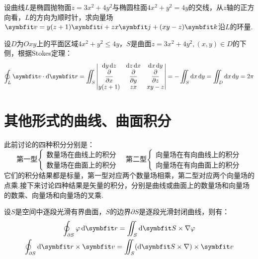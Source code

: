 \begin{question}
    设曲线$L$是椭圆抛物面$z = 3x^2 + 4y^2$与椭圆柱面$4x^2+y^2 = 4y$的交线，从$z$轴的正方向看，$L$的方向为顺时针，求向量场$\vb{v} = y(z+1)\vb{i} + zx\vb{j} + (xy-z)\vb{k}$沿$L$的环量.
\end{question}

\begin{solution}
    设$D$为$Oxy$上的平面区域$4x^2+y^2\leqslant 4y$，$S$是曲面$z = 3x^2+4y^2,(x,y)\in D$的下侧，根据Stokes定理：
    \[\oint_L \vb{v}\cdot\dd{\vb{r}} = \iint_S\begin{vmatrix}
        \dd{y}\dd{z} & \dd{z}\dd{x} & \dd{x}\dd{y} \\
        \displaystyle\pdv{x} & \displaystyle\pdv{y} & \displaystyle\pdv{z} \\
        y(z+1) & zx & xy-z
    \end{vmatrix} = -\iint_S\dd{x}\dd{y} = \iint_D\dd{x}\dd{y} = 2\pi\]
\end{solution}


\section{其他形式的曲线、曲面积分}
此前讨论的四种积分分别是：
\[\text{第一型}\begin{cases}
    \text{数量场在曲线上的积分}\\
    \text{数量场在曲面上的积分}
\end{cases}
\quad\text{第二型}\begin{cases}
    \text{向量场在有向曲线上的积分}\\
    \text{向量场在有向曲面上的积分}
\end{cases}\]
它们的积分结果都是标量，第一型对应两个数量场相乘，第二型对应两个向量场的点乘.接下来讨论四种结果是矢量的积分，分别是曲线或曲面上的数量场和向量场的数乘、向量场和向量场的叉乘.

\begin{theorem}
    设$S$是空间中逐段光滑有界曲面，$S$的边界$\partial S$是逐段光滑封闭曲线，则有：
    \begin{gather*}
        \oint_{\partial S}\varphi\dd{\vb{r}} = \iint_S \dd{\vb{S}} \times \nabla\varphi \\
        \oint_{\partial S}\dd{\vb{r}}\times\vb{v} = \iint_S(\dd{\vb{S}}\times\nabla)\times\vb{v}
    \end{gather*}
\end{theorem}

